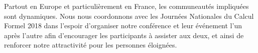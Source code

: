 \documentclass[12pt]{amsbook}
\begin{document}
Partout en Europe et particulièrement en France, les communeautés impliquées sont dynamiques. Nous nous coordonnons avec les Journées Nationales du Calcul Formel 2018 dans l'espoir d'organiser notre conférence et leur événement l'un après l'autre afin d'encourager les participants à assister aux deux, et ainsi de renforcer notre attractivité pour les personnes éloignées.
\end{document}
